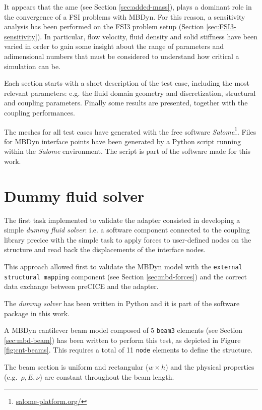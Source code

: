 It appears that the \acrfull{ame} (see Section \ref{sec:added-mass}), plays a dominant role in the convergence of a FSI problems with MBDyn. For this reason, a sensitivity analysis has been performed on the FSI3 problem setup (Section \ref{sec:FSI3-sensitivity}). In particular, flow velocity, fluid density and solid stiffness have been varied in order to gain some insight about the range of parameters and adimensional numbers that must be considered to understand how critical a simulation can be.     

Each section starts with a short description of the test case, including the most relevant parameters: e.g. the fluid domain geometry and discretization, structural and coupling parameters. Finally some results are presented, together with the coupling performances.

The meshes for all test cases have generated with the free software \textit{Salome}\footnote{\href{https://www.salome-platform.org/}{salome-platform.org/}}. Files for MBDyn interface points have been generated by a Python script running within the \textit{Salome} environment. The script is part of the software made for this work. 


\section{Dummy fluid solver}
\label{sec:dummy}

The first task implemented to validate the adapter consisted in developing a simple \textit{dummy fluid solver}: i.e. a software component connected to the coupling library \acrshort{precice} with the simple task to apply forces to user-defined nodes on the structure and read back the displacements of the interface nodes.

This approach allowed first to validate the MBDyn model with the \texttt{external structural mapping} component (see Section \ref{sec:mbd-forces}) and the correct data exchange between preCICE and the adapter. 

The \textit{dummy solver} has been written in Python and it is part of the software package in this work.

A MBDyn cantilever beam model composed of 5 \texttt{beam3} elements (see Section \ref{sec:mbd-beam}) has been written to perform this test, as depicted in Figure \ref{fig:cnt-beams}. This requires a total of 11 \texttt{node} elements to define the structure.

The beam section is uniform and rectangular ($w \times h$) and the physical properties (e.g.~$\rho, E, \nu$) are constant throughout the beam length. 


